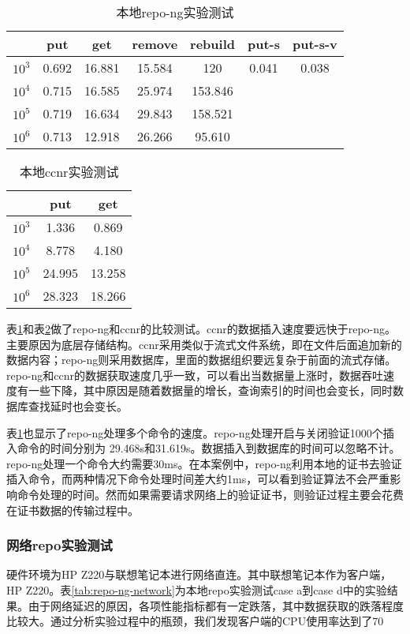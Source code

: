\begin{table}[!htbp]
\centering
\caption{本地repo-ng实验测试}
\label{tab:repo-ng-local}
\begin{tabular}{ | c | c | c | c | c | c | c | }
    \hline
           & put & get & remove & rebuild & put-s & put-s-v \\ \hline
    $10^3$ & 0.692 & 16.881 & 15.584 & 120 & 0.041 & 0.038  \\ \hline
    $10^4$ & 0.715 & 16.585 & 25.974 & 153.846 & & \\ \hline
    $10^5$ & 0.719 & 16.634 & 29.843 & 158.521 & & \\ \hline
    $10^6$ & 0.713 & 12.918 & 26.266 & 95.610 & &\\ \hline
\end{tabular}
\end{table}

\begin{table}
\centering
\caption{本地ccnr实验测试}
\label{tab:ccnr-local}
\begin{tabular}{ | c | c | c | }
    \hline
           & put & get \\ \hline
    $10^3$ & 1.336 & 0.869 \\ \hline
    $10^4$ & 8.778 & 4.180 \\ \hline
    $10^5$ & 24.995 & 13.258 \\ \hline
    $10^6$ & 28.323 & 18.266 \\ \hline
\end{tabular}
\end{table}

表\ref{tab:repo-ng-local}和表\ref{tab:ccnr-local}做了repo-ng和ccnr的比较测试。ccnr的数据插入速度要远快于repo-ng。主要原因为底层存储结构。ccnr采用类似于流式文件系统，即在文件后面追加新的数据内容；repo-ng则采用数据库，里面的数据组织要远复杂于前面的流式存储。repo-ng和ccnr的数据获取速度几乎一致，可以看出当数据量上涨时，数据吞吐速度有一些下降，其中原因是随着数据量的增长，查询索引的时间也会变长，同时数据库查找延时也会变长。

表\ref{tab:repo-ng-local}也显示了repo-ng处理多个命令的速度。repo-ng处理开启与关闭验证1000个插入命令的时间分别为 29.468s和31.619s。数据插入到数据库的时间可以忽略不计。repo-ng处理一个命令大约需要30ms。在本案例中，repo-ng利用本地的证书去验证插入命令，而两种情况下命令处理时间差大约1ms，可以看到验证算法不会严重影响命令处理的时间。然而如果需要请求网络上的验证证书，则验证过程主要会花费在证书数据的传输过程中。

\subsubsection{网络repo实验测试}
硬件环境为HP Z220与联想笔记本进行网络直连。其中联想笔记本作为客户端，HP Z220。表\ref{tab:repo-ng-network}为本地repo实验测试case a到case d中的实验结果。由于网络延迟的原因，各项性能指标都有一定跌落，其中数据获取的跌落程度比较大。通过分析实验过程中的瓶颈，我们发现客户端的CPU使用率达到了70%

